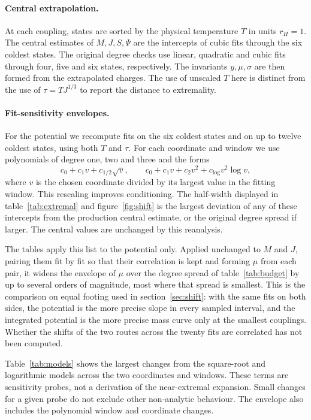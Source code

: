 \documentclass[11pt,a4paper]{article}
\begin{document}
\paragraph{Central extrapolation.}
At each coupling, states are sorted by the physical temperature $T$
in units $r_H=1$. The central estimates of $M,J,S,\Psi$ are the
intercepts of cubic fits through the six coldest states.
The original degree checks use linear, quadratic and cubic fits
through four, five and six states, respectively.
The invariants $y,\mu,\sigma$ are then formed from the extrapolated
charges. The use of unscaled $T$ here is distinct from the use
of $\tau=TJ^{1/3}$ to report the distance to extremality.

\paragraph{Fit-sensitivity envelopes.}
For the potential we recompute fits on the six coldest states and
on up to twelve coldest states, using both $T$ and $\tau$.
For each coordinate and window we use polynomials of degree one,
two and three and the forms
\begin{equation*}
 c_0+c_1v+c_{1/2}\sqrt v,\qquad
 c_0+c_1v+c_2v^2+c_{\log}v^2\log v,
\end{equation*}
where $v$ is the chosen coordinate divided by its largest value
in the fitting window. This rescaling improves conditioning.
The half-width displayed in table~\ref{tab:extremal} and
figure~\ref{fig:shift} is the largest deviation of any of these
intercepts from the production central estimate, or the original
degree spread if larger.
The central values are unchanged by this reanalysis.

The tables apply this list to the potential only. Applied unchanged to $M$ and
$J$, pairing them fit by fit so that their correlation is kept and forming
$\mu$ from each pair, it widens the envelope of $\mu$ over the degree spread of
table~\ref{tab:budget} by up to several orders of magnitude, most where that
spread is smallest. This is the comparison on equal footing used in
section~\ref{sec:shift}: with the same fits on both sides, the potential is the
more precise slope in every sampled interval, and the integrated potential is
the more precise mass curve only at the smallest couplings. Whether the shifts
of the two routes across the twenty fits are correlated has not been
computed.

Table~\ref{tab:models} shows the largest changes from the square-root
and logarithmic models across the two coordinates and windows.
These terms are sensitivity probes, not a derivation of the
near-extremal expansion. Small changes for a given probe do not
exclude other non-analytic behaviour.
The envelope also includes the polynomial window and coordinate changes.
\end{document}
